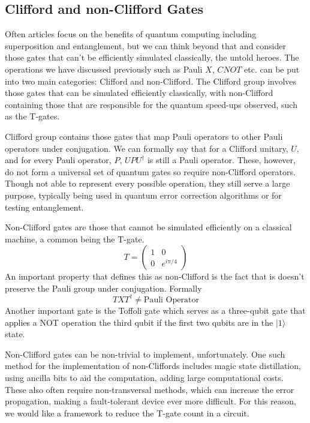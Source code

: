 \documentclass[12pt]{article}
\newcommand{\newp}
    {
    \vskip 0.5cm 
  }
\numberwithin{equation}{section}
\begin{document}
\subsection{Clifford and non-Clifford Gates}
Often articles focus on the benefits of quantum computing including superposition 
and entanglement, but we can think beyond that and consider those gates that can't
be efficiently simulated classically, the untold heroes. 
The operations we have discussed previously such as Pauli $X$, $CNOT$ etc. can be put 
into two main categories: Clifford and non-Clifford. The Clifford group involves 
those gates that can be simulated efficiently classically, with non-Clifford 
containing those that are responsible for the quantum speed-ups observed, such as 
the T-gates. 
\newp 
Clifford group contains those gates that map Pauli operators to other Pauli 
operators under conjugation. We can formally say that for a Clifford unitary, $U$, 
and for every Pauli operator, $P$, $UPU^{\dagger}$ is still a Pauli operator. 
These, however, do not form a universal set of quantum gates so require 
non-Clifford operators. Though not able to represent every possible operation,
they still serve a large purpose, typically being used in quantum error correction 
algorithms or for testing entanglement. 
\newp 
Non-Clifford gates are those that cannot be simulated efficiently on a classical 
machine, a common being the T-gate. 
\begin{equation}
  T = 
  \begin{pmatrix} 
1 & 0 \\ 
0 & e^{i\pi/4} 
\end{pmatrix} 
\end{equation}
An important property that defines this as non-Clifford is the fact that is doesn't 
preserve the Pauli group under conjugation. Formally 
\begin{equation}
  TXT^{\dagger} \neq \text{Pauli Operator}
\end{equation}
Another important gate is the Toffoli gate which serves as a three-qubit gate 
that applies a NOT operation the third qubit if the first two qubits are in the 
$|1\rangle$ state.
\newp 
Non-Clifford gates can be non-trivial to implement, unfortunately. 
One such method for the implementation of non-Cliffords includes magic state 
distillation, using ancilla bits to aid the computation, adding large computational 
costs. These also often require non-transversal methods, which can increase the 
error propagation, making a fault-tolerant device ever more difficult. For this 
reason, we would like a framework to reduce the T-gate count in a circuit.
\end{document}
